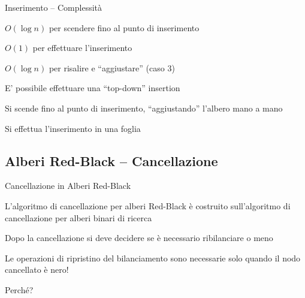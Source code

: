 \begin{frame}{Inserimento -- Complessità}

\begin{myboxtitle}
\BIL
\item $O(\log n)$ per scendere fino al punto di inserimento
\item $O(1)$ per effettuare l'inserimento
\item $O(\log n)$ per risalire e “aggiustare” (caso 3)
\EIL
\end{myboxtitle}

\begin{myboxtitle}[Nota]
\BIL
\item E' possibile effettuare una “top-down” insertion
\item Si scende fino al punto di inserimento, “aggiustando” l'albero mano a mano
\item Si effettua l'inserimento in una foglia
\EIL
\end{myboxtitle}

\end{frame}

\subsection{Alberi Red-Black -- Cancellazione}

\begin{frame}{Cancellazione in Alberi Red-Black}

\BIL
\item L’algoritmo di cancellazione per alberi Red-Black è costruito 
sull’algoritmo di cancellazione per alberi binari di ricerca
\item Dopo la cancellazione si deve decidere se è necessario ribilanciare o meno
\item Le operazioni di ripristino del bilanciamento sono necessarie solo quando il nodo cancellato è nero! 
\item Perché?
\EIL

\end{frame}

